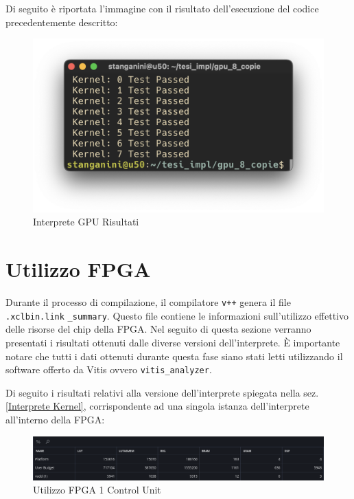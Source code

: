 \vspace{0.3cm}

\noindent Di seguito è riportata l'immagine con il risultato dell'esecuzione del codice precedentemente descritto: 

\begin{figure}[h!]
\centering
\includegraphics[scale=0.45]{images/Capitolo5/4_im.png}
\caption{Interprete GPU Risultati}
\label{gpurisultati}
\end{figure}

\clearpage 

\section{Utilizzo FPGA}
\label{utilizzofpga}
Durante il processo di compilazione, il compilatore \texttt{v++} genera il file \texttt{.xclbin.link} \texttt{\_summary}. Questo  file contiene le informazioni sull'utilizzo effettivo delle risorse del chip della FPGA. Nel seguito di questa sezione verranno presentati i risultati ottenuti dalle diverse versioni dell'interprete. È importante notare che tutti i dati ottenuti durante questa fase siano stati letti utilizzando il software offerto da Vitis ovvero \texttt{vitis\_analyzer}. 

\vspace{0.3cm}

\noindent Di seguito i risultati relativi alla versione dell'interprete spiegata nella sez. \ref{Interprete Kernel}, corrispondente ad una singola istanza dell'interprete all'interno della FPGA:

\begin{figure}[h!]
\centering
\includegraphics[scale=0.40]{images/Capitolo5/5_im.png}
\caption{Utilizzo FPGA 1 Control Unit}
\label{utlizzo1cu}
\end{figure}

